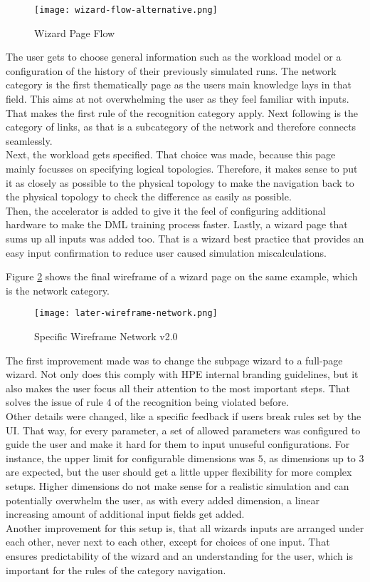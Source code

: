 \begin{figure}[h]
    \centering
    \texttt{[image: wizard-flow-alternative.png]}
    \caption{Wizard Page Flow}
    \label{fig:wizard-flow}
\end{figure}

The user gets to choose general information such as the workload model or a configuration of the history of their previously simulated runs.
The network category is the first thematically page as the users main knowledge lays in that field. This aims at not overwhelming the user as they feel familiar with inputs. That makes the first rule of the recognition category apply.
Next following is the category of links, as that is a subcategory of the network and therefore connects seamlessly. \\
Next, the workload gets specified. That choice was made, because this page mainly focusses on specifying logical topologies. Therefore, it makes sense to put it as closely as possible to the physical topology to make the navigation back to the physical topology to check the difference as easily as possible. \\
Then, the accelerator is added to give it the feel of configuring additional hardware to make the \ac{DML} training process faster. 
Lastly, a wizard page that sums up all inputs was added too. That is a wizard best practice that provides an easy input confirmation to reduce user caused simulation miscalculations. 

Figure \ref{fig:wire-3} shows the final wireframe of a wizard page on the same example, which is the network category. 

\begin{figure}[h]
    \centering
    \texttt{[image: later-wireframe-network.png]}
    \caption{Specific Wireframe Network v2.0}
    \label{fig:wire-3}
\end{figure}

The first improvement made was to change the subpage wizard to a full-page wizard. Not only does this comply with \ac{HPE} internal branding guidelines, but it also makes the user focus all their attention to the most important steps. That solves the issue of rule $4$ of the recognition being violated before. \\
Other details were changed, like a specific feedback if users break rules set by the \ac{UI}. That way, for every parameter, a set of allowed parameters was configured to guide the user and make it hard for them to input unuseful configurations.
For instance, the upper limit for configurable dimensions was $5$, as dimensions up to $3$ are expected, but the user should get a little upper flexibility for more complex setups. Higher dimensions do not make sense for a realistic simulation and can potentially overwhelm the user, as with every added dimension, a linear increasing amount of additional input fields get added. \\
Another improvement for this setup is, that all wizards inputs are arranged under each other, never next to each other, except for choices of one input. That ensures predictability of the wizard and an understanding for the user, which is important for the rules of the category navigation.

